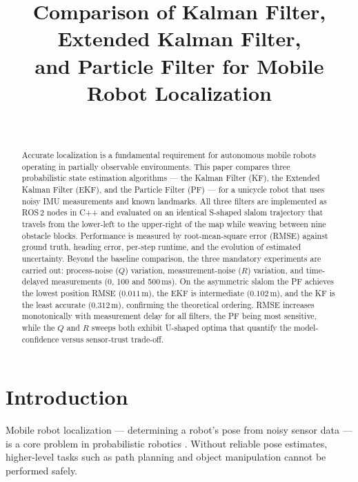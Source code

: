 \documentclass[conference]{IEEEtran}
\begin{document}
\title{Comparison of Kalman Filter, Extended Kalman Filter,\\
       and Particle Filter for Mobile Robot Localization}

\author{\\
}

\maketitle

\begin{abstract}
Accurate localization is a fundamental requirement for autonomous mobile robots
operating in partially observable environments.
This paper compares three probabilistic state estimation algorithms ---
the Kalman Filter (KF), the Extended Kalman Filter (EKF), and the Particle Filter (PF) ---
for a unicycle robot that uses noisy IMU measurements and known landmarks.
All three filters are implemented as ROS\,2 nodes in C++ and evaluated on an
identical S-shaped slalom trajectory that travels from the lower-left to the
upper-right of the map while weaving between nine obstacle blocks.
Performance is measured by root-mean-square error (RMSE) against ground truth,
heading error, per-step runtime, and the evolution of estimated uncertainty.
Beyond the baseline comparison, the three mandatory experiments are carried out:
process-noise ($Q$) variation, measurement-noise ($R$) variation, and
time-delayed measurements (0, 100 and 500\,ms).
On the asymmetric slalom the PF achieves the lowest position RMSE
($0.011$\,m), the EKF is intermediate ($0.102$\,m), and the KF is the least
accurate ($0.312$\,m), confirming the theoretical ordering.
RMSE increases monotonically with measurement delay for all filters, the PF
being most sensitive, while the $Q$ and $R$ sweeps both exhibit U-shaped optima
that quantify the model-confidence versus sensor-trust trade-off.
\end{abstract}

\section{Introduction}

Mobile robot localization --- determining a robot's pose from noisy sensor data ---
is a core problem in probabilistic robotics \cite{Thrun2005Probabilistic}.
Without reliable pose estimates, higher-level tasks such as path planning and
object manipulation cannot be performed safely.
\end{document}
